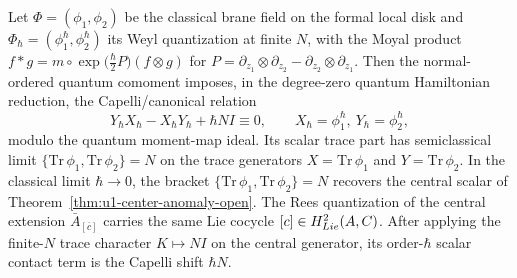 \documentclass[11pt]{memoir}
\begin{document}
\begin{thm}\label{thm:quantum-classical-anomaly}
  Let $\Phi=(\phi_1,\phi_2)$ be the classical brane field on the formal
  local disk and $\Phi_\hbar=(\phi_1^{\hbar},\phi_2^{\hbar})$ its Weyl
  quantization at finite $N$, with the Moyal product
  $f*g=m\circ\exp\bigl(\tfrac{\hbar}{2}P\bigr)(f\otimes g)$ for
  $P=\partial_{z_1}\otimes\partial_{z_2}-\partial_{z_2}\otimes\partial_{z_1}$.
  Then the normal-ordered quantum comoment imposes, in the degree-zero
  quantum Hamiltonian reduction, the Capelli/canonical relation
  $$Y_{\hbar}X_{\hbar}-X_{\hbar}Y_{\hbar}+\hbar N I\equiv0,\qquad
    X_{\hbar}=\phi_1^{\hbar},\ Y_{\hbar}=\phi_2^{\hbar},$$
  modulo the quantum moment-map ideal. Its scalar trace part has
  semiclassical limit
  $\{\mathrm{Tr}\,\phi_1,\mathrm{Tr}\,\phi_2\}=N$ on the trace generators
  $X=\mathrm{Tr}\,\phi_1$ and $Y=\mathrm{Tr}\,\phi_2$.
  In the classical limit $\hbar\to 0$, the bracket
  $\{\mathrm{Tr}\,\phi_1,\mathrm{Tr}\,\phi_2\}=N$ recovers the central scalar
  of Theorem~\ref{thm:u1-center-anomaly-open}.
  The Rees quantization of the central extension
  $\bar A_{[\bar c]}$ carries the same Lie cocycle
  $[c]\in H^2_{Lie}(A,C)$. After applying the
  finite-\(N\) trace character \(K\mapsto N I\) on the central generator,
  its order-\(\hbar\) scalar contact term is the Capelli shift \(\hbar N\).
\end{thm}
\end{document}
